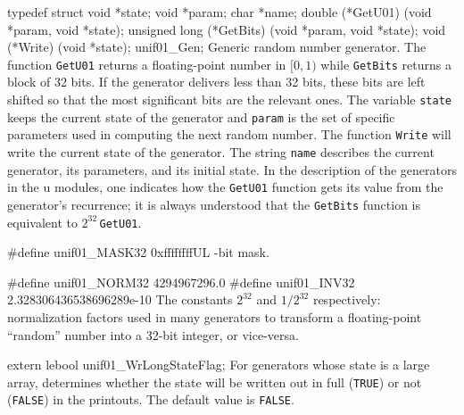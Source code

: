 \code

typedef struct {
   void *state;
   void *param;
   char *name;
   double (*GetU01) (void *param, void *state);
   unsigned long (*GetBits) (void *param, void *state);
   void (*Write) (void *state);
} unif01_Gen;
\endcode
  \tab Generic random number generator. The function {\tt GetU01}
   returns a floating-point number in $[0,1)$ while {\tt GetBits}
   returns a block of 32 bits. If the generator delivers less than 32
   bits, these bits are left shifted so that the most
   significant bits are the relevant ones.
   The variable {\tt state} keeps the
   current state of the generator and {\tt param} is the set of
   specific parameters used in computing the next random number. 
   The function  {\tt Write} will write the current state of the
   generator. The string  {\tt name}  describes the current generator,
   its parameters, and its initial state.
   In the description of the generators in the u modules, one
   indicates how the {\tt GetU01} function  gets its value from the
   generator's recurrence;
   it is always understood that the {\tt GetBits}  function is
   equivalent to $2^{32}\,${\tt GetU01}.
  \endtab


\ifdetailed
\code

#define unif01_MASK32  0xffffffffUL
\endcode
  -bit mask.
 \endtab
\code


#define unif01_NORM32  4294967296.0
#define unif01_INV32   2.328306436538696289e-10
\endcode 
 \tab The constants $2^{32}$ and $1/2^{32}$ respectively: 
   normalization factors used in many generators to transform
  a floating-point ``random'' number into a 32-bit integer, or vice-versa.
 \endtab
\fi

\code


extern lebool unif01_WrLongStateFlag;
\endcode
  \tab For generators whose state is a large array, determines whether
   the state will be written out in full ({\tt TRUE}) or not ({\tt FALSE})
   in the printouts. The default value is {\tt FALSE}. 
 \endtab



